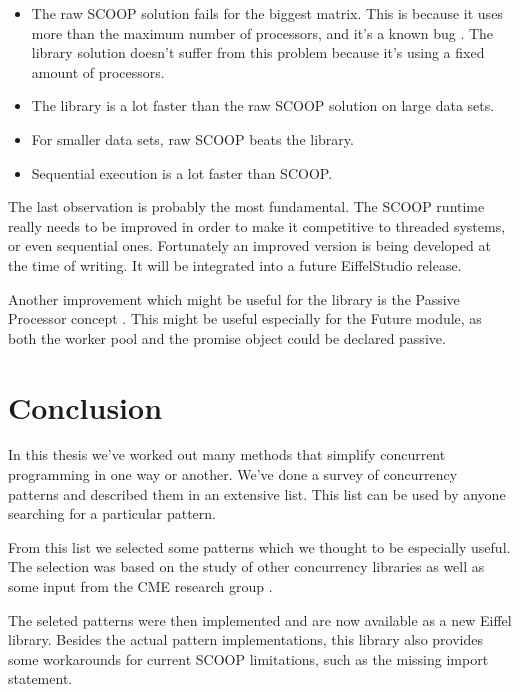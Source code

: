\documentclass[a4paper,10pt]{article}
\newcommand{\todoref}{\todo{ref}}
\begin{document}
\begin{itemize}
 \item The raw SCOOP solution fails for the biggest matrix. 
 This is because it uses more than the maximum number of processors, and it's a known bug .
 The library solution doesn't suffer from this problem because it's using a fixed amount of processors.
 \item The library is a lot faster than the raw SCOOP solution on large data sets.
 \item For smaller data sets, raw SCOOP beats the library.
 \item Sequential execution is a lot faster than SCOOP.
\end{itemize}

The last observation is probably the most fundamental.
The SCOOP runtime really needs to be improved in order to make it competitive to threaded systems, or even sequential ones.
Fortunately an improved version  is being developed at the time of writing.
It will be integrated into a future EiffelStudio release.

Another improvement which might be useful for the library is the Passive Processor concept \todoref.
This might be useful especially for the Future module, as both the worker pool and the promise object could be declared passive.

\section{Conclusion}


In this thesis we've worked out many methods that simplify concurrent programming in one way or another.
We've done a survey of concurrency patterns and described them in an extensive list.
This list can be used by anyone searching for a particular pattern.

From this list we selected some patterns which we thought to be especially useful.
The selection was based on the study of other concurrency libraries as well as some input from the CME research group \todoref.

The seleted patterns were then implemented and are now available as a new Eiffel library.
Besides the actual pattern implementations, this library also provides some workarounds for current SCOOP limitations, such as the missing import statement.
\end{document}
